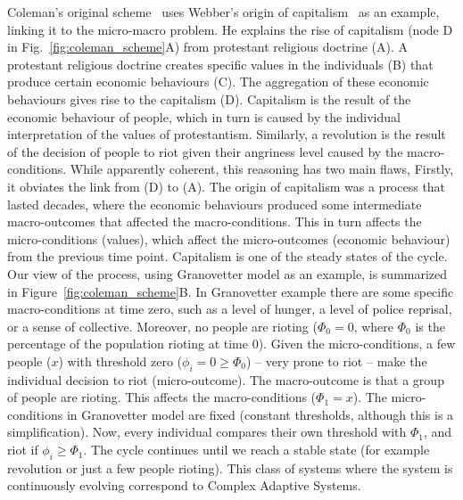 Coleman’s original scheme~\cite{coleman1990} uses Webber’s origin of capitalism~\citep{weber1904} as an example, 
linking it to the micro-macro problem. 
He explains the rise of capitalism (node D in Fig.~\ref{fig:coleman_scheme}A) from protestant religious doctrine (A). 
A protestant religious doctrine creates specific values in the individuals (B) that produce certain economic behaviours (C). 
The aggregation of these economic behaviours gives rise to the capitalism (D). 
Capitalism is the result of the economic behaviour of people, which in turn is caused by the individual interpretation of the values of protestantism.
Similarly, a revolution is the result of the decision of people to riot given their angriness level caused by the macro-conditions.
While apparently coherent, this reasoning has two main flaws, 
Firstly, it obviates the link from (D) to (A). 
The origin of capitalism was a process that lasted decades, 
where the economic behaviours produced some intermediate macro-outcomes that affected the macro-conditions. 
This in turn affects the micro-conditions (values), 
which affect the micro-outcomes (economic behaviour) from the previous time point. 
Capitalism is one of the steady states of the cycle.
Our view of the process, using Granovetter model as an example, is summarized in Figure~\ref{fig:coleman_scheme}B. 
In Granovetter example there are some specific macro-conditions at time zero, 
such as a level of hunger, a level of police reprisal, or a sense of collective.
Moreover, no people are rioting ($\Phi_0 = 0$, where $\Phi_0$ is the percentage of the population rioting at time 0). 
Given the micro-conditions, a few people ($x$) with threshold zero ($\phi_i = 0 \geq \Phi_0$) -- very prone to riot -- make the individual decision to riot (micro-outcome). 
The macro-outcome is that a group of people are rioting. 
This affects the macro-conditions ($\Phi_1 = x$). 
The micro-conditions in Granovetter model are fixed (constant thresholds, although this is a simplification).
Now, every individual compares their own threshold with $\Phi_1$, and riot if $\phi_i \geq \Phi_1$. 
The cycle continues until we reach a stable state (for example revolution or just a few people rioting).
This class of systems where the system is continuously evolving correspond to Complex Adaptive Systems.


